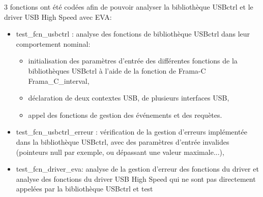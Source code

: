 3 fonctions ont été codées afin de pouvoir analyser la bibliothèque USBctrl et le driver USB High Speed avec EVA:
\begin{itemize}
    \item test\_fcn\_usbctrl : analyse des fonctions de bibliothèque USBctrl dans leur comportement nominal:
    	\begin{itemize}
    		\item initialisation des paramètres d'entrée des différentes fonctions de la bibliothèques USBctrl à l'aide de la fonction de Frama-C Frama\_C\_interval,
    		\item déclaration de deux contextes USB, de plusieurs interfaces USB,
    		\item appel des fonctions de gestion des événements et des requètes.
    	\end{itemize}
    \item test\_fcn\_usbctrl\_erreur : vérification de la gestion d'erreurs implémentée dans la bibliothèque USBctrl, avec des paramètres d'entrée invalides (pointeurs null par exemple, ou dépassant une valeur maximale...),
    \item test\_fcn\_driver\_eva: analyse de la gestion d'erreur des fonctions du driver et analyse des fonctions du driver USB High Speed qui ne sont pas directement appelées par la bibliothèque USBctrl et test
\end{itemize}

